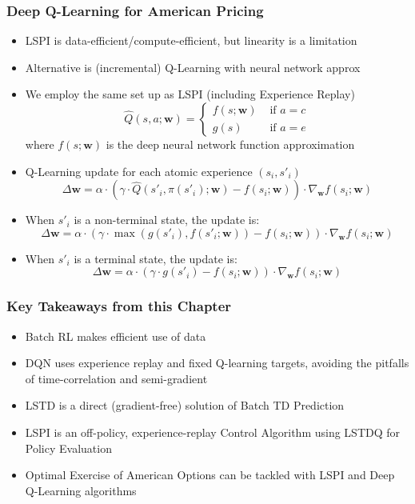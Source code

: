 \documentclass[handout]{beamer}
\begin{document}
\begin{frame}
\frametitle{Deep Q-Learning for American Pricing}
\pause
\begin{itemize}[<+->]
\item LSPI is data-efficient/compute-efficient, but linearity is a limitation
\item Alternative is (incremental) Q-Learning with neural network approx
\item We employ the same set up as LSPI (including Experience Replay)
$$
\hat{Q}(s,a; \bm{w}) =
\begin{cases}
f(s;\bm{w}) & \text{ if } a = c \\
g(s) & \text{ if } a = e
\end{cases}
$$
where $f(s; \bm{w})$ is the deep neural network function approximation
\item Q-Learning update for each atomic experience $(s_i,s'_i)$
$$\Delta \bm{w} = \alpha \cdot (\gamma \cdot \hat{Q}(s'_i, \pi(s'_i); \bm{w}) - f(s_i;\bm{w})) \cdot \nabla_{\bm{w}} f(s_i;\bm{w})$$
\item When $s'_i$ is a non-terminal state, the update is:
$$\Delta \bm{w} =  \alpha \cdot (\gamma \cdot \max(g(s'_i), f(s'_i;\bm{w})) - f(s_i;\bm{w})) \cdot \nabla_{\bm{w}} f(s_i;\bm{w})$$
\item When $s'_i$ is a terminal state, the update is:
$$\Delta \bm{w} = \alpha \cdot (\gamma \cdot g(s'_i) - f(s_i;\bm{w})) \cdot \nabla_{\bm{w}} f(s_i;\bm{w})$$
\end{itemize}
\end{frame}

\begin{frame}
\frametitle{Key Takeaways from this Chapter}
\pause
\begin{itemize}[<+->]
\item Batch RL makes efficient use of data
\item DQN uses experience replay and fixed Q-learning targets, avoiding the pitfalls of time-correlation and semi-gradient
\item LSTD is a direct (gradient-free) solution of Batch TD Prediction
\item LSPI is an off-policy, experience-replay Control Algorithm using LSTDQ for Policy Evaluation
\item Optimal Exercise of American Options can be tackled with LSPI and Deep Q-Learning algorithms
\end{itemize}
\end{frame}
\end{document}
